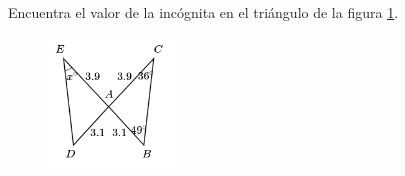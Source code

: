 \question[10]  Encuentra el valor de la incógnita en el triángulo de la figura \ref{fig:angle_triangle_15}.
\begin{figure}[H]
    \begin{center}
        \includegraphics[width=0.3\textwidth]{../images/angle_triangle_15.png}
    \end{center}
    \caption{}
    \label{fig:angle_triangle_15}
\end{figure}
